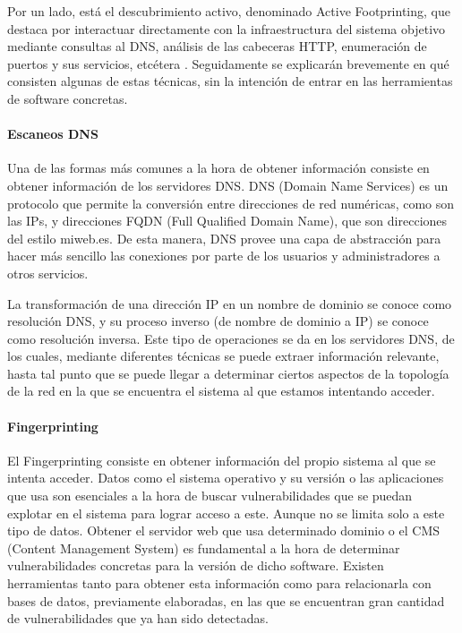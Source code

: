 Por un lado, está el descubrimiento activo, denominado Active Footprinting, que destaca por interactuar directamente con la infraestructura del sistema objetivo mediante consultas al DNS, análisis de las cabeceras HTTP, enumeración de puertos y sus servicios, etcétera \cite{pentesting-kali}. Seguidamente se explicarán brevemente en qué consisten algunas de estas técnicas, sin la intención de entrar en las herramientas de software concretas.

\paragraph{Escaneos DNS}

Una de las formas más comunes a la hora de obtener información consiste en obtener información de los servidores DNS. DNS (Domain Name Services) es un protocolo que permite la conversión entre direcciones de red numéricas, como son las IPs, y direcciones FQDN (Full Qualified Domain Name), que son direcciones del estilo miweb.es. De esta manera, DNS provee una capa de abstracción para hacer más sencillo las conexiones por parte de los usuarios y administradores a otros servicios.

La transformación de una dirección IP en un nombre de dominio se conoce como resolución DNS, y su proceso inverso (de nombre de dominio a IP) se conoce como resolución inversa. Este tipo de operaciones se da en los servidores DNS, de los cuales, mediante diferentes técnicas se puede extraer información relevante, hasta tal punto que se puede llegar a determinar ciertos aspectos de la topología de la red en la que se encuentra el sistema al que estamos intentando acceder.

\paragraph{Fingerprinting}

El Fingerprinting consiste en obtener información del propio sistema al que se intenta acceder. Datos como el sistema operativo y su versión o las aplicaciones que usa son esenciales a la hora de buscar vulnerabilidades que se puedan explotar en el sistema para lograr acceso a este. Aunque no se limita solo a este tipo de datos. Obtener el servidor web que usa determinado dominio o el CMS (Content Management System) es fundamental a la hora de determinar vulnerabilidades concretas para la versión de dicho software. Existen herramientas tanto para obtener esta información como para relacionarla con bases de datos, previamente elaboradas, en las que se encuentran gran cantidad de vulnerabilidades que ya han sido detectadas.

